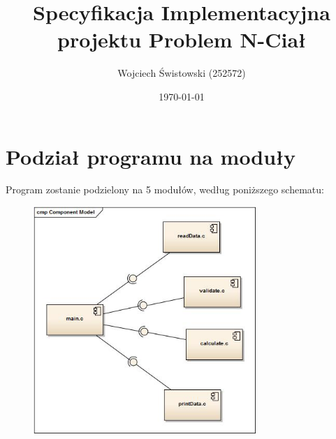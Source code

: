 \documentclass[a4paper,11pt,notitlepage]{article}
\author{Wojciech Świstowski (252572)}
\title{Specyfikacja Implementacyjna projektu Problem N-Ciał}
\date{\today}
\begin{document}
\maketitle

\section{Podział programu na moduły}

Program zostanie podzielony na 5 modułów, według poniższego schematu:
\begin{figure}[ht!]
\centering
\includegraphics[width=0.75\textwidth]{moduly.jpg}
\end{figure}
\end{document}
